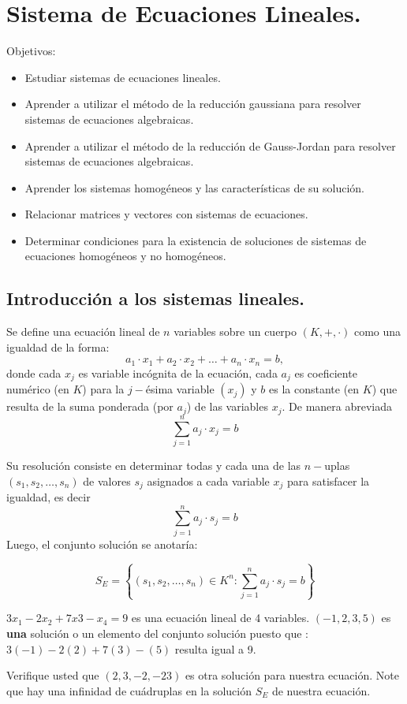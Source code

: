 \section{Sistema de Ecuaciones Lineales.}
Objetivos:
\begin{itemize}
    \item Estudiar sistemas de ecuaciones lineales.
    \item Aprender a utilizar el método de la reducción gaussiana para resolver sistemas de ecuaciones algebraicas.
    \item Aprender a utilizar el método de la reducción de Gauss-Jordan para resolver sistemas de ecuaciones algebraicas.
    \item Aprender los sistemas homogéneos y las características de su solución.
    \item Relacionar matrices y vectores con sistemas de ecuaciones.
    \item Determinar condiciones para la existencia de soluciones de sistemas de ecuaciones homogéneos y no homogéneos.
\end{itemize}
\subsection{Introducción a los sistemas lineales.}

\begin{defin}
Se define una ecuación lineal de $n$ variables sobre un cuerpo $(K, +, ·)$
como una igualdad de la forma: 
\[a_1\cdot x_1 + a_2\cdot x_2 + \dots  + a_n\cdot x_n = b,\]
donde cada $x_j$ es variable incógnita de la ecuación, cada $a_j$ es coeficiente numérico (en $K$)
para la $j-$ésima variable $(x_j)$ y $b$ es la constante (en $K$) que resulta de la suma ponderada (por $a_j$) de las variables $x_j$. De manera abreviada
\[\sum_{j=1}^n a_j \cdot x_j=b\]
\end{defin}
Su resolución consiste en determinar todas y cada una de las $n-$uplas $(s_1, s_2,\dots, s_n )$ de valores
$s_j$ asignados a cada variable $x_j$ para satisfacer la igualdad, es decir 
\[\sum_{j=1}^n a_j \cdot s_j=b\]
Luego, el conjunto solución se anotaría:

\[S_E=\left\{(s_1, s_2,\dots, s_n )\in K^n \colon \sum_{j=1}^n a_j \cdot s_j=b\right\}\]

\begin{ejem}
$3x_1 - 2x_2 + 7x3 - x_4 = 9$ es una ecuación lineal de 4 variables.
$(-1, 2, 3, 5 )$ es \textbf{una} solución o un elemento del conjunto solución puesto que : $3(-1) - 2(2) + 7(3) -(5)$ resulta igual a 9.

Verifique usted que $(2, 3, -2, -23)$ es otra solución para nuestra ecuación.
Note que hay una infinidad de cuádruplas en la solución $S_E$ de nuestra ecuación.
\end{ejem}

